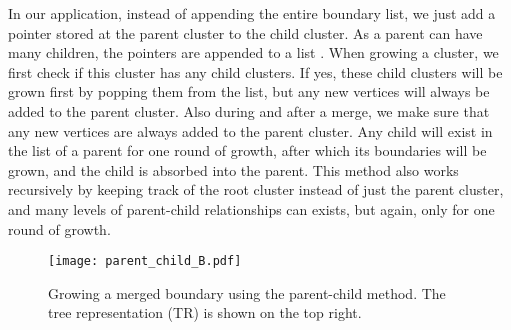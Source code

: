 In our application, instead of appending the entire boundary list, we just add a pointer stored at the parent cluster to the child cluster. As a parent can have many children, the pointers are appended to a list . When growing a cluster, we first check if this cluster has any child clusters. If yes, these child clusters will be grown first by popping them from the list, but any new vertices will always be added to the parent cluster. Also during and after a merge, we make sure that any new vertices are always added to the parent cluster. Any child will exist in the list of a parent for one round of growth, after which its boundaries will be grown, and the child is absorbed into the parent. This method also works recursively by keeping track of the root cluster instead of just the parent cluster, and many levels of parent-child relationships can exists, but again, only for one round of growth.

\begin{figure}
  \centering
  \texttt{[image: parent\_child\_B.pdf]}
  \caption{Growing a merged boundary using the parent-child method. The tree representation (TR) is shown on the top right. }\label{3.fig.parentchildB}
\end{figure}










